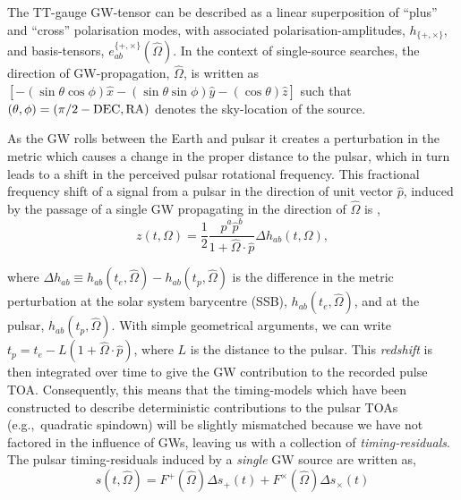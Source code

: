 \documentclass[twocolappendix,tighten]{emulateapj}
\begin{document}




The TT-gauge GW-tensor can be described as a linear superposition of ``plus'' and ``cross'' polarisation modes, with associated polarisation-amplitudes, $h_{\{+,\times\}}$, and basis-tensors, $e_{ab}^{\{+,\times\}}(\hat\Omega)$. In the context of single-source searches, the direction of GW-propagation, $\hat\Omega$, is written as $\left[-(\sin\theta\cos\phi)\hat{x} - (\sin\theta\sin\phi)\hat{y} - (\cos\theta)\hat{z}\right]$ such that $(\theta,\phi) = (\pi/2 - {\rm DEC}, {\rm RA})$ denotes the sky-location of the source.

As the GW rolls between the Earth and pulsar it creates a perturbation in the metric which causes a change in the proper distance to the pulsar, which in turn leads to a shift in the perceived pulsar rotational frequency. This fractional frequency shift of a signal from a pulsar in the direction of unit vector $\hat{p}$, induced by the passage of a single GW propagating in the direction of $\hat\Omega$ is \citep{anholm-2009,brook-flanagan-2011},
\begin{equation}
z(t,\Omega) = \frac{1}{2}\frac{\hat{p}^a\hat{p}^b}{1+\hat\Omega\cdot\hat{p}}\Delta h_{ab}(t,\Omega),
\end{equation}

where $\Delta h_{ab}\equiv h_{ab}(t_e,\hat\Omega) - h_{ab}(t_p,\hat\Omega)$ is the difference in the metric perturbation at the solar system barycentre (SSB), $h_{ab}(t_e,\hat\Omega)$, and at the pulsar, $h_{ab}(t_p,\hat\Omega)$. With simple geometrical arguments, we can write $t_p = t_e - L(1+\hat\Omega\cdot\hat{p})$, where $L$ is the distance to the pulsar. This {\it redshift} is then integrated over time to give the GW contribution to the recorded pulse TOA. 
Consequently, this means that the timing-models which have been constructed to describe deterministic contributions to the pulsar TOAs (e.g.,\ quadratic spindown) will be slightly mismatched because we have not factored in the influence of GWs, leaving us with a collection of {\it timing-residuals}. The pulsar timing-residuals induced by a {\it single} GW source are written as,
\begin{equation} \label{eq:GWinducedresiduals}
s(t,\hat\Omega) = F^+(\hat\Omega)\Delta s_+(t) + F^\times(\hat\Omega)\Delta s_\times(t)
\end{equation}
\end{document}
